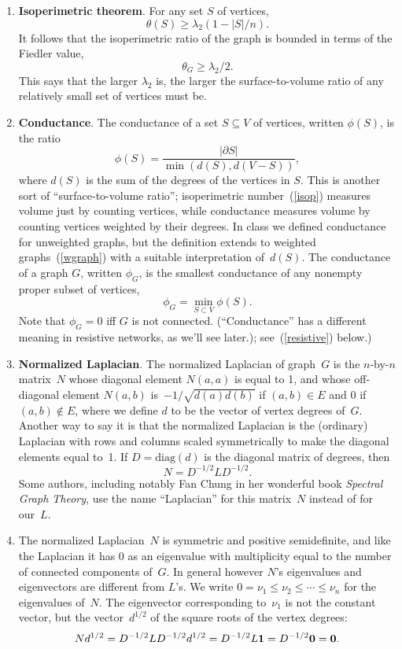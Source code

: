 \documentclass[11pt]{article}
\newcommand{\m}[1]{{\bf{#1}}}       %
\newcommand{\ones}{\m1}             %
\newcommand{\zeros}{\m0}            %
\newcommand{\diag}{\mbox{diag}}
\begin{document}
\begin{enumerate}
\item\label{isopthm} {\bf Isoperimetric theorem}.
For any set $S$ of vertices, 
$$\theta(S) \geq \lambda_2(1-|S|/n).$$
It follows that the isoperimetric ratio of the graph is bounded 
in terms of the Fiedler value,
$$\theta_G \geq \lambda_2/2.$$
This says that the larger $\lambda_2$ is, the larger the surface-to-volume
ratio of any relatively small set of vertices must be.

\item\label{cond}{\bf Conductance}.
The conductance of a set $S\subseteq V$ of vertices,
written $\phi(S)$, is the ratio 
$$\phi(S) = \frac{|\partial S|}{\min(d(S),d(V-S))},$$
where $d(S)$ is the sum of the degrees of the vertices in $S$.
This is another sort of ``surface-to-volume ratio'';
isoperimetric number~(\ref{isop}) measures volume just by counting vertices, 
while conductance measures volume by counting vertices weighted by their degrees.
In class we defined conductance for unweighted graphs,
but the definition extends to weighted graphs~(\ref{wgraph}) with
a suitable interpretation of~$d(S)$.
The conductance of a graph $G$,
written $\phi_G$, is the smallest conductance of any nonempty 
proper subset of vertices,
$$\phi_G = \min_{S\subset V}\phi(S).$$
Note that $\phi_G=0$ iff $G$ is not connected.
(``Conductance'' has a different meaning in resistive networks, as we'll see later.); see~(\ref{resistive}) below.)

\item\label{nlap}{\bf Normalized Laplacian}.
The normalized Laplacian of graph~$G$ is 
the $n$-by-$n$ matrix~$N$
whose diagonal element $N(a,a)$ is equal to 1,
and whose off-diagonal element $N(a,b)$ 
is~$-1/\sqrt{d(a)d(b)}$ if $(a,b) \in E$ and $0$ if $(a,b) \notin E$,
where we define $d$ to be the vector of vertex degrees of~$G$.
Another way to say it is that the normalized Laplacian is 
the (ordinary) Laplacian with rows and columns scaled symmetrically 
to make the diagonal elements equal to~1. 
If $D=\diag(d)$ is the diagonal matrix of degrees, 
then 
$$N = D^{-1/2}LD^{-1/2}.$$
Some authors, including notably Fan Chung in her 
wonderful book {\em Spectral Graph Theory}, 
use the name ``Laplacian'' for this matrix~$N$
instead of for our~$L$.

\item\label{nlapeig}
The normalized Laplacian~$N$ is symmetric and 
positive semidefinite, and like the Laplacian
it has 0 as an eigenvalue with multiplicity
equal to the number of connected components
of~$G$.  In general however $N$'s eigenvalues
and eigenvectors are different from $L$'s.
We write $0=\nu_1\leq \nu_2\leq \cdots\leq \nu_n$
for the eigenvalues of~$N$.
The eigenvector corresponding to~$\nu_1$ is
not the constant vector, but the vector~$d^{1/2}$
of the square roots of the vertex degrees:
$$Nd^{1/2} = D^{-1/2}LD^{-1/2}d^{1/2} = D^{-1/2}L\ones = D^{-1/2}\zeros = \zeros.$$


\end{enumerate}
\end{document}
